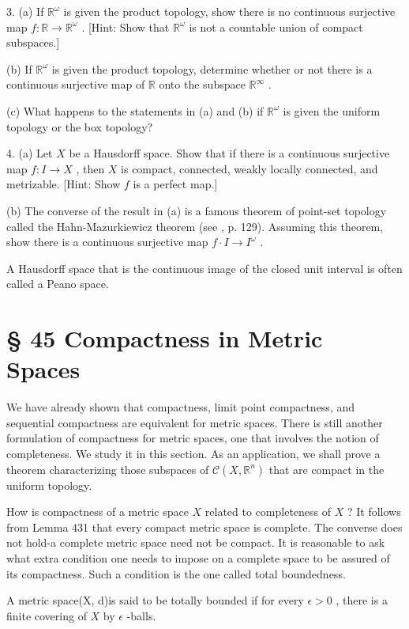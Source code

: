 3. (a) If \({\mathbb{R}}^{\omega }\) is given the product topology, show there is no continuous surjective map \(f : \mathbb{R} \rightarrow  {\mathbb{R}}^{\omega }\) . [Hint: Show that \({\mathbb{R}}^{\omega }\) is not a countable union of compact subspaces.]

(b) If \({\mathbb{R}}^{\omega }\) is given the product topology, determine whether or not there is a continuous surjective map of \(\mathbb{R}\) onto the subspace \({\mathbb{R}}^{\infty }\) .

(c) What happens to the statements in (a) and (b) if \({\mathbb{R}}^{\omega }\) is given the uniform topology or the box topology?

4. (a) Let \(X\) be a Hausdorff space. Show that if there is a continuous surjective map \(f : I \rightarrow  X\) , then \(X\) is compact, connected, weakly locally connected, and metrizable. [Hint: Show \(f\) is a perfect map.]

(b) The converse of the result in (a) is a famous theorem of point-set topology called the Hahn-Mazurkiewicz theorem (see 		\cite{HockingYoung1961}, p. 129). Assuming this theorem, show there is a continuous surjective map \(f \cdot  I \rightarrow  {I}^{\omega }\) .

A Hausdorff space that is the continuous image of the closed unit interval is often called a Peano space.

\section*{§ 45 Compactness in Metric Spaces}

We have already shown that compactness, limit point compactness, and sequential compactness are equivalent for metric spaces. There is still another formulation of compactness for metric spaces, one that involves the notion of completeness. We study it in this section. As an application, we shall prove a theorem characterizing those subspaces of \(\mathcal{C}\left( {X,{\mathbb{R}}^{n}}\right)\) that are compact in the uniform topology.

How is compactness of a metric space \(X\) related to completeness of \(X\) ? It follows from Lemma 431 that every compact metric space is complete. The converse does not hold-a complete metric space need not be compact. It is reasonable to ask what extra condition one needs to impose on a complete space to be assured of its compactness. Such a condition is the one called total boundedness.

\begin{definition} A metric space(X, d)is said to be totally bounded if for every \(\epsilon  > 0\) , there is a finite covering of \(X\) by \(\epsilon\) -balls.
\end{definition}

